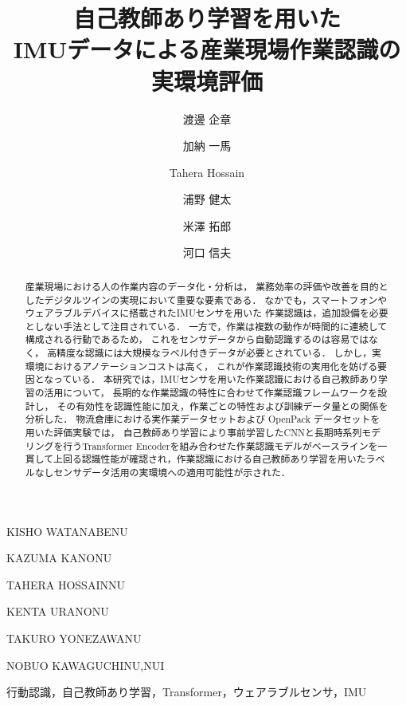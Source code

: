 \documentclass[submit]{ipsj}
\newcommand{\rev}[1]{{\color{red}#1}}
\begin{document}
{\title{\rev{自己教師あり学習を用いた \\ IMUデータによる産業現場作業認識の実環境評価}}




\author{渡邊 企章}{KISHO WATANABE}{NU}
\author{加納 一馬}{KAZUMA KANO}{NU}
\author{Tahera Hossain}{TAHERA HOSSAIN}{NU}
\author{浦野 健太}{KENTA URANO}{NU}
\author{米澤 拓郎}{TAKURO YONEZAWA}{NU}
\author{河口 信夫}{NOBUO KAWAGUCHI}{NU,NUI}

\begin{abstract}
産業現場における人の作業内容のデータ化・分析は，
業務効率の評価や改善を目的としたデジタルツインの実現において重要な要素である．
なかでも，スマートフォンやウェアラブルデバイスに搭載されたIMUセンサを用いた
作業認識は，追加設備を必要としない手法として注目されている．
一方で，作業は複数の動作が時間的に連続して構成される行動であるため，
これをセンサデータから自動認識するのは容易ではなく，
高精度な認識には大規模なラベル付きデータが必要とされている．
しかし，実環境におけるアノテーションコストは高く，
これが作業認識技術の実用化を妨げる要因となっている．
\rev{本研究では，IMUセンサを用いた作業認識における自己教師あり学習の活用について，
長期的な作業認識の特性に合わせて作業認識フレームワークを設計し，
その有効性を認識性能に加え，作業ごとの特性および訓練データ量との関係を分析した．}
物流倉庫における実作業データセットおよび OpenPack データセットを用いた評価実験では，
\rev{自己教師あり学習により事前学習したCNNと長期時系列モデリングを行うTransformer Encoderを組み合わせた作業認識モデルがベースラインを一貫して上回る認識性能が確認され，作業認識における自己教師あり学習を用いたラベルなしセンサデータ活用の実環境への適用可能性が示された．}
\end{abstract}


\begin{jkeyword}
行動認識，自己教師あり学習，Transformer，ウェアラブルセンサ，IMU
\end{jkeyword}

}
\end{document}
